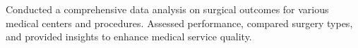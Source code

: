 \item{Conducted a comprehensive data analysis on surgical outcomes for various medical centers and procedures. Assessed performance, compared surgery types, and provided insights to enhance medical service quality.}

